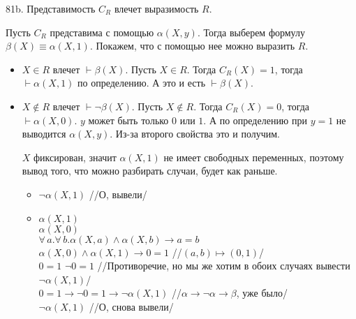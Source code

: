 \documentclass[12pt]{article}
\begin{document}
81b. Представимость $C_R$ влечет выразимость $R$.

Пусть $C_R$ представима с помощью $\alpha(X,y)$. Тогда выберем формулу $\beta(X)\equiv\alpha(X, 1)$. Покажем, что с помощью нее можно выразить $R$.
\begin{itemize}
	\item $X\in R$ влечет $\vdash\beta(X)$. Пусть $X\in R$. Тогда $C_R(X)=1$, тогда $\vdash\alpha(X,1)$ по определению. А это и есть $\vdash\beta(X)$.
	\item $X\notin R$ влечет $\vdash\neg\beta(X)$. Пусть $X\notin R$. Тогда $C_R(X)=0$, тогда $\vdash\alpha(X,0)$. $y$ может быть только $0$ или $1$. А по определению при $y=1$ не выводится $\alpha(X, y)$. Из-за второго свойства это и получим.
	
	$X$ фиксирован, значит $\alpha(X,1)$ не имеет свободных переменных, поэтому вывод того, что можно разбирать случаи, будет как раньше.
	\begin{itemize}
		\item $\neg\alpha(X,1)$ //О, вывели/
		\item $\alpha(X,1)$\\
		$\alpha(X,0)$\\
		$\forall\,a.\forall\,b.\alpha(X,a)\wedge\alpha(X,b)\to a=b$\\
		$\alpha(X,0)\wedge\alpha(X,1)\to 0=1$ //$(a,b)\mapsto(0,1)$/\\
		$0=1$
		$\neg0=1$ //Противоречие, но мы же хотим в обоих случаях вывести $\neg\alpha(X,1)$/\\
		$0=1\to\neg0=1\to\neg\alpha(X,1)$ //$\alpha\to\neg\alpha\to\beta$, уже было/\\
		$\neg\alpha(X,1)$ //О, снова вывели/\\
	\end{itemize}
\end{itemize}

\bigskip
\end{document}
